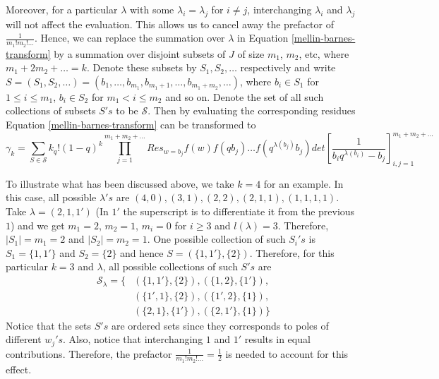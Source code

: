 Moreover, for a particular $\lambda$ with some $\lambda_i = \lambda_j$ for $i \neq j$, interchanging $\lambda_i$ and $\lambda_j$ will not affect the evaluation. This allows us to cancel away the prefactor of $\frac{1}{m_1! m_2! \dots}$. Hence, we can replace the summation over $\lambda$ in Equation \ref{mellin-barnes-transform} by a summation over disjoint subsets of $\mathit{J}$ of size $m_1$, $m_2$, etc, where $m_1 + 2m_2 + \dots = k$. Denote these subsets by $S_1, S_2, \dots$ respectively and write $S = (S_1, S_2, \dots ) = (b_1, \dots, b_{m_1}, b_{m_1+1}, \dots, b_{m_1 + m_2}, \dots)$, where $b_i \in S_1$ for $1 \le i \le m_1$, $b_i \in S_2$ for $m_1 < i \le m_2$ and so on. Denote the set of all such collections of subsets $S's$ to be $\mathcal{S}$. Then by evaluating the corresponding residues Equation \ref{mellin-barnes-transform} can be transformed to
\begin{equation}
\gamma_k = \sum_{S \in \mathcal{S}} k_q! (1-q)^k \prod_{j=1}^{m_1+m_2+\dots} Res_{w=b_j} f(w) f(qb_j) \dots f(q^{\lambda(b_j)} b_j) det\left[ \frac{1}{b_iq^{\lambda(b_i)} - b_j} \right]_{i,j=1}^{m_1+m_2+\dots}
\end{equation}

To illustrate what has been discussed above, we take $k = 4$ for an example. In this case, all possible $\lambda 's$ are $(4,0), (3,1), (2,2), (2,1,1), (1,1,1,1)$. Take $\lambda = (2,1,1')$ (In $1'$ the superscript is to differentiate it from the previous $1$) and we get $m_1 = 2$, $m_2 = 1$, $m_i = 0$ for $i \ge 3$ and $l(\lambda) = 3$. Therefore, $|S_1| = m_1 = 2$ and $|S_2| = m_2 = 1$. One possible collection of such $S_i's$ is $S_1 = \{1,1'\}$ and $S_2 = \{2\}$ and hence $S = (\{1,1'\},  \{2\})$. Therefore, for this particular $k = 3$ and $\lambda$, all possible collections of such $S's$ are 
\begin{align}
\mathcal{S}_{\lambda} = \{ &(\{1,1'\},\{2\}), (\{1,2\},\{1'\}), \\ 
													 &(\{1',1\},\{2\}), (\{1', 2\},\{1\}),\\
													 &(\{2,1\},\{1'\}), (\{2,1'\},\{1\})\}
\end{align}
Notice that the sets $S's$ are ordered sets since they corresponds to poles of different $w_j's$. Also, notice that interchanging $1$ and $1'$ results in equal contributions. Therefore, the prefactor $\frac{1}{m_1! m_2! \dots} = \frac{1}{2}$ is needed to account for this effect.

